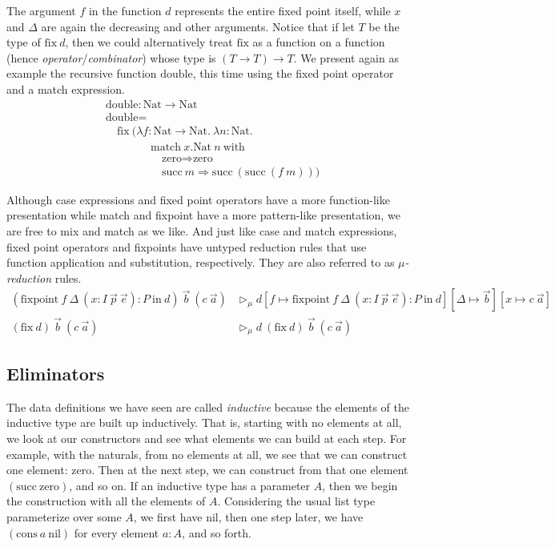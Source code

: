 \documentclass{report}
\newcommand{\Nat}{\const{Nat}}
\newcommand{\zero}{\const{zero}}
\renewcommand{\succ}{\const{succ}}
\newcommand{\nil}{\const{nil}}
\newcommand{\cons}{\const{cons}}
\newcommand{\const}[1]{\text{#1}}
\newcommand{\match}{\const{match}}
\newcommand{\with}{\const{with}}
\newcommand{\inn}{\const{in}}
\newcommand{\fixpoint}{\const{fixpoint}}
\newcommand{\fix}{\const{fix}}
\begin{document}
The argument $f$ in the function $d$ represents the entire fixed point itself, while $x$ and $\Delta$ are again the decreasing and other arguments. Notice that if let $T$ be the type of $\fix ~ d$, then we could alternatively treat $\fix$ as a function on a function (hence \emph{operator}/\emph{combinator}) whose type is $(T \to T) \to T$. We present again as example the recursive function $\const{double}$, this time using the fixed point operator and a match expression.
%
\begin{align*}
    &\const{double} : \Nat \to \Nat \\
    &\const{double} = \\
    &\quad \fix ~ (\lambda f : \Nat \to \Nat. ~ \lambda n: \Nat. \\
    &\qquad\qquad \match ~ x.\Nat ~ n ~ \with \\
    &\quad\qquad\qquad \zero \Rightarrow \zero \\
    &\quad\qquad\qquad \succ ~ m \Rightarrow \succ ~ (\succ ~ (f ~ m)))
\end{align*}

Although case expressions and fixed point operators have a more function-like presentation while match and fixpoint have a more pattern-like presentation, we are free to mix and match as we like. And just like case and match expressions, fixed point operators and fixpoints have untyped reduction rules that use function application and substitution, respectively. They are also referred to as \emph{$\mu$-reduction} rules.
%
\begin{align*}
    (\fixpoint ~ f ~ \Delta ~ (x : I ~ \Vec{p} ~ \Vec{e}) : P ~ \inn ~ d) ~ \Vec{b} ~ (c ~ \Vec{a}) &\rhd_{\mu} d[f \mapsto \fixpoint ~ f ~ \Delta ~ (x : I ~ \Vec{p} ~ \Vec{e}) : P ~ \inn ~ d][\Delta \mapsto \Vec{b}][x \mapsto c ~ \Vec{a}] \\
    (\fix ~ d) ~ \Vec{b} ~ (c ~ \Vec{a}) &\rhd_{\mu} d ~ (\fix ~ d) ~ \Vec{b} ~ (c ~ \Vec{a})
\end{align*}

\subsection{Eliminators}

The data definitions we have seen are called \emph{inductive} because the elements of the inductive type are built up inductively. That is, starting with no elements at all, we look at our constructors and see what elements we can build at each step. For example, with the naturals, from no elements at all, we see that we can construct one element: $\zero$. Then at the next step, we can construct from that one element $(\succ ~ \zero)$, and so on. If an inductive type has a parameter $A$, then we begin the construction with all the elements of $A$. Considering the usual list type parameterize over some $A$, we first have $\nil$, then one step later, we have $(\cons ~ a ~ \nil)$ for every element $a : A$, and so forth.
\end{document}
